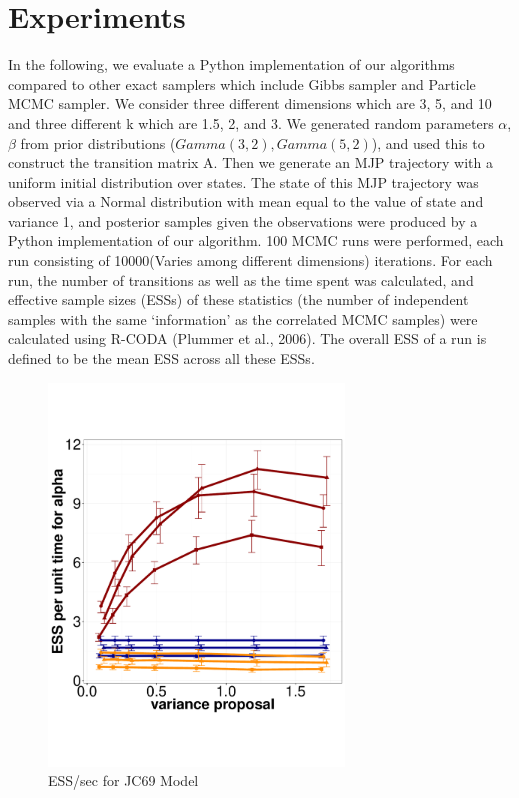 \section{Experiments}
In the following, we evaluate a Python implementation of our algorithms compared to other exact samplers which include Gibbs sampler and Particle MCMC sampler. We consider three different dimensions which are 3, 5, and 10 and three different k which are 1.5, 2, and 3. We generated random parameters $\alpha$, $\beta$ from prior distributions ($Gamma(3,2), Gamma(5, 2)$), and used this to construct the transition matrix A. Then we generate an MJP trajectory with a uniform initial distribution over states. The state of this MJP trajectory was observed via a Normal distribution with mean equal to the value of state and variance 1, and posterior samples given the observations were produced by a Python implementation of our algorithm. 100 MCMC runs were performed, each run consisting of 10000(Varies among different dimensions) iterations. For each run, the number of transitions as well as the time spent was calculated, and effective sample sizes (ESSs) of these statistics (the number of independent samples with the same `information' as the correlated MCMC samples) were calculated using R-CODA (Plummer et al., 2006). The overall ESS of a run is defined to be the mean ESS across all these ESSs.

  \begin{figure}%
  \begin{minipage}[!hp]{0.45\linewidth}
  \centering
    \includegraphics [width=0.70\textwidth, angle=0]{figs/jc.pdf}
    \vspace{-0 in}
    \caption{ESS/sec for JC69 Model }
     \label{fig:ESS_JC}
  \end{minipage}
  \end{figure}




